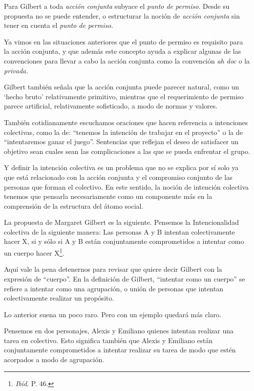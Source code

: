 \documentclass[oneside]{book}
\begin{document}
Para Gilbert a toda \textit{acción conjunta} subyace el \textit{punto de permiso}. Desde su propuesta no se puede entender, o estructurar la noción de \textit{acción conjunta} sin tener en cuenta el \textit{punto de permiso.}

Ya vimos en las situaciones anteriores que el punto de permiso es requisito para la acción conjunta, y que además este concepto ayuda a explicar algunas de las convenciones para llevar a cabo la acción conjunta como la convención \textit{ah doc} o  la \textit{privada.} 

Gilbert también señala que la acción conjunta puede parecer natural, como un ‘hecho bruto’ relativamente primitivo, mientras que el requerimiento de permiso parece artificial, relativamente sofisticado, a modo de normas y valores.

También cotidianamente escuchamos oraciones que hacen referencia a intenciones colectivas, como la de: “tenemos la intención de trabajar en el proyecto” o la de “intentaremos ganar el juego”. Sentencias que reflejan el deseo de satisfacer un objetivo sean cuales sean las complicaciones a las que se pueda enfrentar el grupo. 

Y definir  la intención colectiva es un problema que no se explica por sí solo ya que está relacionado con la acción conjunta y el compromiso conjunto de las personas que forman el colectivo. En este sentido, la noción de intención colectiva tenemos que pensarla necesariamente como un componente más en la comprensión de la estructura del átomo social.

La propuesta de Margaret Gilbert es la siguiente. Pensemos la Intencionalidad colectiva de la siguiente manera: Las personas A y B intentan colectivamente hacer X, si y sólo si A y B están conjuntamente comprometidos a intentar como un cuerpo hacer X\footnote{\textit{Ibíd}. P. 46.}.

Aquí vale la pena detenernos para revisar que quiere decir Gilbert con la expresión de “cuerpo”. En la definición de Gilbert, “intentar como un cuerpo” se refiere a intentar como una agrupación, o unión de personas que intentan colectivamente realizar un propósito. 

Lo anterior suena un poco raro. Pero con un ejemplo quedará más claro.

Pensemos en dos personajes, Alexis y Emiliano quienes intentan realizar una tarea en colectivo. Esto significa también que Alexis y Emiliano están conjuntamente comprometidos a intentar realizar su tarea de modo que estén acorpados a modo de agrupación.
\end{document}
